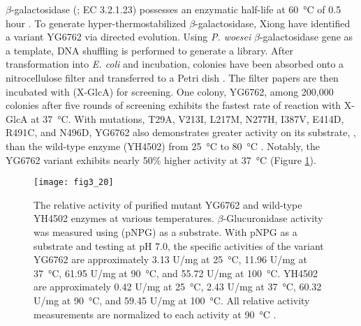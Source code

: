 \begin{refsection}
$\beta$-galactosidase (; EC 3.2.1.23)
possesses an enzymatic half-life at \SI{60}{\celsius} of 0.5 hour
\cite{Melchers1970,Chen2008}. To generate hyper-thermostabilized
$\beta$-galactosidase, Xiong  have identified a variant YG6762 via
directed evolution. Using \emph{P. woesei} $\beta$-galactosidase gene as a
template, DNA shuffling is performed to generate a library. After
transformation into \emph{E. coli} and incubation, colonies have been absorbed onto
a nitrocellulose filter and transferred to a Petri dish
\cite{Xiong2007,Xiong2007a}. The filter papers are then incubated with
 (X-GlcA) for
screening. One colony, YG6762, among 200,000 colonies after five rounds of
screening exhibits the fastest rate of reaction with X-GlcA at
\SI{37}{\celsius}. With mutations, T29A, V213I, L217M, N277H, I387V, E414D,
R491C, and N496D, YG6762 also demonstrates greater activity on its substrate,
, than the wild-type enzyme (YH4502)
from \SI{25}{\celsius} to \SI{80}{\celsius} \cite{Xiong2007}. Notably, the
YG6762 variant exhibits nearly 50\% higher activity at \SI{37}{\celsius}
(Figure \ref{fig:yg6762}).
\begin{figure}[htbp] \centering \texttt{[image: fig3\_20]}
    \caption[The
    relative activity of purified mutant YG6762 and wild-type YH4502 enzymes at
    various temperatures. $\beta$-Glucuronidase activity was measured using
     (pNPG) as a substrate. With pNPG as a
    substrate and testing at pH 7.0, the specific activities of the variant
    YG6762 are approximately 3.13 U/mg at \SI{25}{\celsius}, 11.96 U/mg at
    \SI{37}{\celsius}, 61.95 U/mg at \SI{90}{\celsius}, and 55.72 U/mg at
    \SI{100}{\celsius}. YH4502 are approximately 0.42 U/mg at
    \SI{25}{\celsius}, 2.43 U/mg at \SI{37}{\celsius}, 60.32 U/mg at
    \SI{90}{\celsius}, and 59.45 U/mg at \SI{100}{\celsius}. All relative
    activity measurements are normalized to each activity at
\SI{90}{\celsius}.] {The relative activity of purified mutant YG6762 and
    wild-type YH4502 enzymes at various temperatures. $\beta$-Glucuronidase
    activity was measured using  (pNPG) as
    a substrate. With pNPG as a substrate and testing at pH 7.0, the specific
    activities of the variant YG6762 are approximately 3.13 U/mg at
    \SI{25}{\celsius}, 11.96 U/mg at \SI{37}{\celsius}, 61.95 U/mg at
    \SI{90}{\celsius}, and 55.72 U/mg at \SI{100}{\celsius}. YH4502 are
    approximately 0.42 U/mg at \SI{25}{\celsius}, 2.43 U/mg at
    \SI{37}{\celsius}, 60.32 U/mg at \SI{90}{\celsius}, and 59.45 U/mg at
    \SI{100}{\celsius}. All relative activity measurements are normalized to
    each activity at \SI{90}{\celsius} \cite{Xiong2007}.} \label{fig:yg6762}
\end{figure}


\end{refsection}
